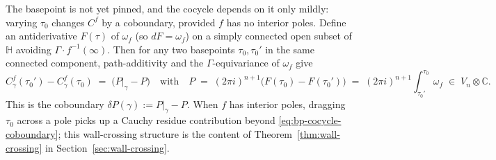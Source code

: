 \documentclass[11pt]{article}
\numberwithin{equation}{section}  %
\newcommand{\HH}{\mathbb{H}}
\newcommand{\CC}{\mathbb{C}}
\begin{document}
The basepoint is not yet pinned, and the cocycle depends on it only
mildly: varying $\tau_0$ changes $C^f$ by a coboundary, provided $f$ has no
interior poles.  Define an antiderivative $F(\tau)$ of $\omega_f$ (so
$dF = \omega_f$) on a simply connected open subset of $\HH$ avoiding
$\Gamma\cdot f^{-1}(\infty)$.  Then for any two basepoints
$\tau_0, \tau_0'$ in the same connected component, path-additivity and the
$\Gamma$-equivariance of $\omega_f$ give
\begin{equation}\label{eq:bp-cocycle-coboundary}
  C^f_\gamma(\tau_0') - C^f_\gamma(\tau_0)
  \;=\; \bigl(P|_\gamma - P\bigr)
  \quad \text{with}\quad
  P \;=\; (2\pi i)^{n+1}\bigl(F(\tau_0) - F(\tau_0')\bigr)
  \;=\; (2\pi i)^{n+1}\!\int_{\tau_0'}^{\tau_0}\!\omega_f
  \;\in\; V_n\otimes\CC.
\end{equation}
This is the coboundary $\delta P(\gamma) := P|_\gamma - P$.  When $f$
has interior poles, dragging $\tau_0$ across a pole picks up a Cauchy
residue contribution beyond \eqref{eq:bp-cocycle-coboundary}; this
wall-crossing structure is the content of Theorem~\ref{thm:wall-crossing}
in Section~\ref{sec:wall-crossing}.



\end{document}
